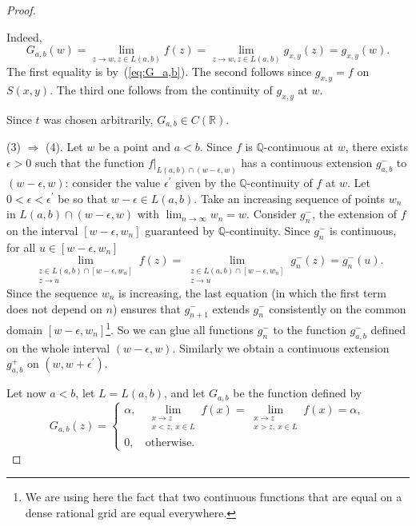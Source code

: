 \documentclass[11pt]{amsart} %
\theoremstyle{definition}
\begin{document}
\begin{proof}
\begin{itemize}
Indeed, 
\begin{equation}
G_{a,b}(w)=\lim_{z\rightarrow w,z\in L(a,b)}f(z)= \lim_{z\rightarrow w,z\in L(a,b)}g_{x,y}(z)=g_{x,y}(w). 
\end{equation} 
The first equality is by~(\ref{eq:G_a,b}). The second follows since $g_{x,y}=f$ on $S(x,y)$. The third one follows from the continuity of $g_{x,y}$ at $w$. 

Since $t$ was chosen
arbitrarily, $G_{a,b}\in C(\mathbb{R})$.

\end{itemize} 


(3) $\Rightarrow$ (4). Let $w$ be a point and $a<b$. Since $f$ is $\mathbb{Q}$-continuous at $w$, there
exists $\epsilon>0$ such that the function $f|_{L(a,b)\cap(w-\epsilon,w)}$ has a continuous extension
$g_{a,b}^{-}$ to $(w-\epsilon,w)$: consider the value $\epsilon^{\prime}$ given by the $\mathbb{Q}$-continuity of $f$ at $w$. Let
$0<\epsilon<\epsilon^{\prime}$ be so that $w-\epsilon\in L(a,b)$. Take an increasing sequence of points $w_{n}$ in $L(a,b)\cap(w-\epsilon,w)$ with $\lim_{n\rightarrow\infty}w_{n}=w$.
Consider $g_{n}^{-}$, the extension of $f$ on the interval $[w-\epsilon,w_{n}]$ guaranteed by $\mathbb{Q}$-continuity. Since $g_{n}^{-}$ is continuous, for all $u\in[w-\epsilon,w_{n}]$
\[ \lim_{\substack{z\in L(a,b)\cap[w-\epsilon,w_{n}]\\z\rightarrow u}}f(z)=\lim_{\substack{z\in L(a,b)\cap[w-\epsilon,w_{n}]\\z\rightarrow u}}g_{n}^{-}(z)=g_{n}^{-}(u). \]
Since the sequence $w_{n}$ is increasing, the last equation (in which the first term
does not depend on $n$) ensures that $g_{n+1}^{-}$ extends $g_{n}^{-}$ consistently on the common
domain $[w-\epsilon,w_{n}]$\footnote{We are using here the fact that two continuous functions that are equal on a dense rational grid are equal everywhere.}. So we can glue all functions $g_{n}^{-}$ to the function $g_{a,b}^{-}$ defined
on the whole interval $(w-\epsilon,w)$. Similarly we obtain a continuous extension $g_{a,b}^{+}$ on $(w,w+\epsilon^{\prime})$. 



Let now $a<b$, let $L=L(a,b)$, and let $G_{a,b}$ be the function
defined by
\begin{equation} 
G_{a,b}(z)=
\begin{cases}
\alpha, &
\displaystyle
\lim_{\substack{x\to z\\x<z,\ x\in L}}f(x)
=
\lim_{\substack{x\to z\\x>z,\ x\in L}}f(x)
=\alpha,\\[1ex]
0, & \text{otherwise}.
\end{cases}
\label{G_a,b,2}
\end{equation} 


\end{proof}
\end{document}
